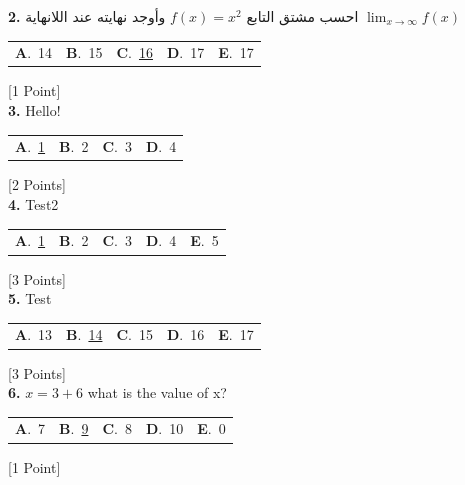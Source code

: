 \documentclass[12pt]{article}
\newcommand{\choice}[2]{\textbf{#1}.~#2}
\begin{document}
\noindent \textbf{\textenglish{2.}} {\textarabic{احسب مشتق التابع }}\( f(x) = x^2\){\textarabic{ وأوجد نهايته عند اللانهاية }}\(\lim_{x \to \infty}f(x)\)

\begin{tabularx}{\linewidth}{@{}*{5}{Y}@{}}
\choice{A}{{{\textenglish{14}}}} & \choice{B}{{{\textenglish{15}}}} & \choice{C}{{\underline{{\textenglish{16}}}}} & \choice{D}{{{\textenglish{17}}}} & \choice{E}{{{\textenglish{17}}}} \\
\end{tabularx}
\hfill {\textenglish{[1 Point]}}\\[0.5em]

\noindent \textbf{\textenglish{3.}} {\textenglish{Hello!}}

\begin{tabularx}{\linewidth}{@{}*{4}{Y}@{}}
\choice{A}{{\underline{{\textenglish{1}}}}} & \choice{B}{{{\textenglish{2}}}} & \choice{C}{{{\textenglish{3}}}} & \choice{D}{{{\textenglish{4}}}} \\
\end{tabularx}
\hfill {\textenglish{[2 Points]}}\\[0.5em]

\noindent \textbf{\textenglish{4.}} {\textenglish{Test2}}

\begin{tabularx}{\linewidth}{@{}*{5}{Y}@{}}
\choice{A}{{\underline{{\textenglish{1}}}}} & \choice{B}{{{\textenglish{2}}}} & \choice{C}{{{\textenglish{3}}}} & \choice{D}{{{\textenglish{4}}}} & \choice{E}{{{\textenglish{5}}}} \\
\end{tabularx}
\hfill {\textenglish{[3 Points]}}\\[0.5em]

\noindent \textbf{\textenglish{5.}} {\textenglish{Test}}

\begin{tabularx}{\linewidth}{@{}*{5}{Y}@{}}
\choice{A}{{{\textenglish{13}}}} & \choice{B}{{\underline{{\textenglish{14}}}}} & \choice{C}{{{\textenglish{15}}}} & \choice{D}{{{\textenglish{16}}}} & \choice{E}{{{\textenglish{17}}}} \\
\end{tabularx}
\hfill {\textenglish{[3 Points]}}\\[0.5em]

\noindent \textbf{\textenglish{6.}} \(x=3+6 \){\textenglish{ what is the value of x?}}

\begin{tabularx}{\linewidth}{@{}*{5}{Y}@{}}
\choice{A}{{{\textenglish{7}}}} & \choice{B}{{\underline{{\textenglish{9}}}}} & \choice{C}{{{\textenglish{8}}}} & \choice{D}{{{\textenglish{10}}}} & \choice{E}{{{\textenglish{0}}}} \\
\end{tabularx}
\hfill {\textenglish{[1 Point]}}\\[0.5em]
\end{document}
